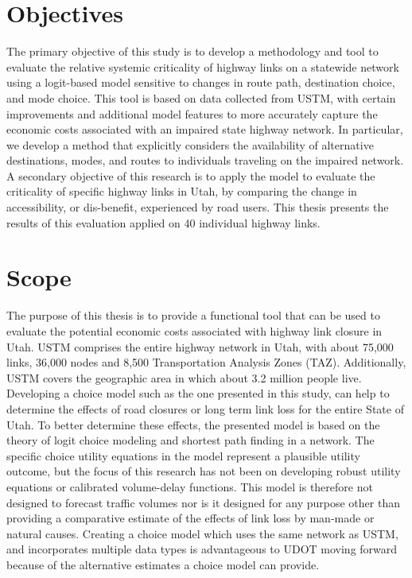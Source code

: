 \section{Objectives}
The primary objective of this study is to develop a methodology and tool to evaluate the
relative systemic criticality of highway links on a statewide network using a logit-based model
sensitive to changes in route path, destination choice, and mode choice.
This tool is based on data collected
from USTM, with certain improvements and additional model
features to more accurately capture the economic costs associated with an impaired state highway
network. In particular, we develop a method that explicitly considers the availability of
alternative destinations, modes, and routes to individuals traveling on the impaired network. A
secondary objective of this research is to apply the model to evaluate the criticality of
specific
highway links in Utah, by comparing the change in accessibility, or dis-benefit,
experienced by road users.
This thesis presents the results of this evaluation applied
on 40 individual highway links.

\section{Scope}
The purpose of this thesis is to provide a functional tool that can be used to evaluate
the potential economic costs associated with highway link closure in Utah. USTM comprises
the entire highway network in Utah, with about 75,000 links, 36,000 nodes and 8,500 Transportation Analysis Zones (TAZ).
Additionally, USTM covers the geographic area in which about 3.2 million people live.
Developing a choice model such as the one presented in this study, can help to determine
the effects of road closures or long term link loss for the entire State of Utah.
To better determine these effects, the presented model is based on the theory of logit choice modeling and
shortest path finding in a network. The specific choice utility equations in the model represent
a plausible utility outcome, but the focus of this research has not been on developing robust
utility equations or calibrated volume-delay functions. This model is therefore not designed to
forecast traffic volumes nor is it designed for any purpose other than providing a comparative estimate
of the effects of link loss by man-made or natural causes. Creating a choice model
which uses the same network as USTM, and incorporates multiple data types is
advantageous to UDOT moving forward because of the alternative estimates a choice
model can provide.

